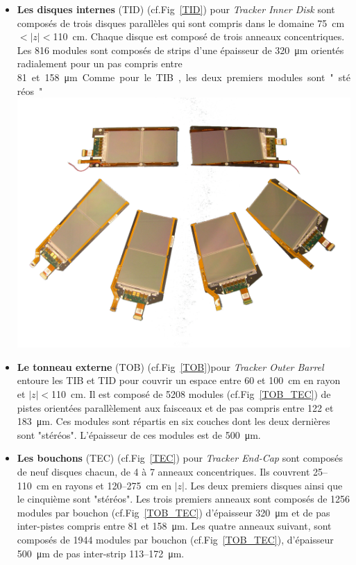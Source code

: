 \begin{itemize}[label=$\bullet$]
\item \textbf{Les disques internes} (TID) (cf.Fig~\ref{TID}) pour \textit{Tracker Inner Disk} sont composés de trois disques parallèles qui sont compris dans le domaine \SI{75}{\centi\meter}$<|z|<$\SI{110}{\centi\meter}. Chaque disque est composé de trois anneaux concentriques. Les \num{816} modules sont composés de strips d'une épaisseur de \SI{320}{\micro\meter} orientés radialement pour un pas compris entre \SI{81} et \SI{158}{\micro\meter}. Comme pour le TIB, les deux premiers modules sont "stéréos".
\marginpar
{
	\centering
	\includegraphics[width=\marginparwidth]{CMS/TOB_TEC.png}
	\label{TOB_TEC}
}
\item \textbf{Le tonneau externe } (TOB) (cf.Fig~\ref{TOB})pour \textit{Tracker Outer Barrel} entoure les TIB et TID pour couvrir un espace entre \num{60} et \SI{100}{\centi\meter} en rayon et $|z|<$\SI{110}{\centi\meter}. Il est composé de \num{5208} modules (cf.Fig~\ref{TOB_TEC}) de pistes orientées parallèlement aux faisceaux et de pas compris entre \num{122} et \SI{183}{\micro\meter}. Ces modules sont répartis en six couches dont les deux dernières sont "stéréos". L'épaisseur de ces modules est de \SI{500}{\micro\meter}.   

\item \textbf{Les bouchons }(TEC) (cf.Fig~\ref{TEC}) pour \textit{Tracker End-Cap} sont composés de neuf disques chacun, de \num{4} à \num{7} anneaux concentriques. Ils couvrent \num{25}--\SI{110}{\centi\meter} en rayons et \num{120}--\SI{275}{\centi\meter} en $|z|$. Les deux premiers disques ainsi que le cinquième sont "stéréos". Les trois premiers anneaux sont composés de \num{1256} modules par bouchon (cf.Fig~\ref{TOB_TEC}) d'épaisseur \SI{320}{\micro\meter} et de pas inter-pistes compris entre \num{81} et \SI{158}{\micro\meter}. Les quatre anneaux suivant, sont composés de \num{1944} modules par bouchon (cf.Fig~\ref{TOB_TEC}), d'épaisseur \SI{500}{\micro\meter} de pas inter-strip \num{113}--\SI{172}{\micro\meter}.
\end{itemize}

